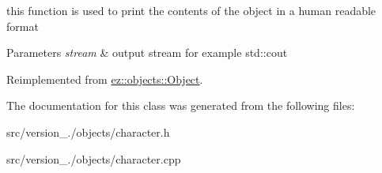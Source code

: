 this function is used to print the contents of the object in a human readable format 
\begin{DoxyParams}{Parameters}
{\em stream} & output stream for example std\+::cout \\
\hline
\end{DoxyParams}


Reimplemented from \hyperlink{classez_1_1objects_1_1Object_a9e20f39a78163f67f000576149d858b3}{ez\+::objects\+::\+Object}.



The documentation for this class was generated from the following files\+:\begin{DoxyCompactItemize}
\item 
src/version\+\_./objects/character.\+h\item 
src/version\+\_./objects/character.\+cpp\end{DoxyCompactItemize}
